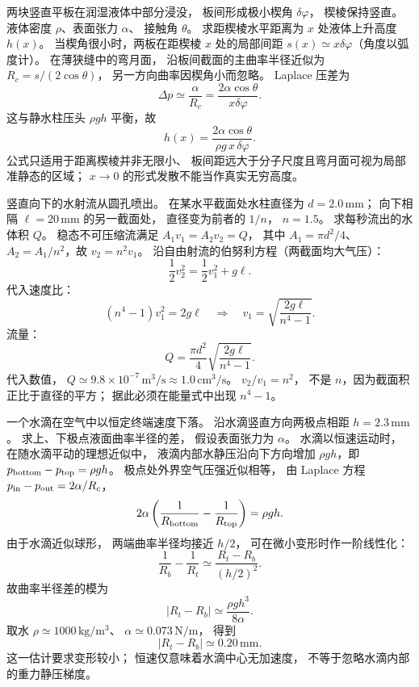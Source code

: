 两块竖直平板在润湿液体中部分浸没，
板间形成极小楔角 $\delta\varphi$，
楔棱保持竖直。
液体密度 $\rho$、表面张力 $\alpha$、
接触角 $\theta$。
求距楔棱水平距离为 $x$ 处液体上升高度 $h(x)$。
\exsolution
当楔角很小时，两板在距楔棱 $x$ 处的局部间距
$s(x)\simeq x\delta\varphi$（角度以弧度计）。
在薄狭缝中的弯月面，
沿板间截面的主曲率半径近似为
$R_c=s/(2\cos\theta)$，
另一方向曲率因楔角小而忽略。
Laplace 压差为
\[
\Delta p\simeq\frac{\alpha}{R_c}
=\frac{2\alpha\cos\theta}{x\delta\varphi}.
\]
这与静水柱压头 $\rho gh$ 平衡，故
\[
\boxed{h(x)=\frac{2\alpha\cos\theta}
{\rho g\,x\,\delta\varphi}}.
\]
\excheck 公式只适用于距离楔棱并非无限小、
板间距远大于分子尺度且弯月面可视为局部准静态的区域；
$x\to0$ 的形式发散不能当作真实无穷高度。

竖直向下的水射流从圆孔喷出。
在某水平截面处水柱直径为
$d=2.0\,\mathrm{mm}$；
向下相隔
$\ell=20\,\mathrm{mm}$ 的另一截面处，
直径变为前者的 $1/n$，
$n=1.5$。
求每秒流出的水体积 $Q$。
\exsolution
稳态不可压缩流满足
$A_1v_1=A_2v_2=Q$，
其中
$A_1=\pi d^2/4$、
$A_2=A_1/n^2$，故
$v_2=n^2v_1$。
沿自由射流的伯努利方程（两截面均大气压）：
\[
\frac12v_2^2=\frac12v_1^2+g\ell.
\]
代入速度比：
\[
(n^4-1)v_1^2=2g\ell
\quad\Longrightarrow\quad
v_1=\sqrt{\frac{2g\ell}{n^4-1}}.
\]
流量：
\[
\boxed{Q=\frac{\pi d^2}{4}
\sqrt{\frac{2g\ell}{n^4-1}}}.
\]
代入数值，
$\boxed{Q\simeq9.8\times10^{-7}\,\mathrm{m^3/s}
\approx1.0\,\mathrm{cm^3/s}}$。
\excheck $v_2/v_1=n^2$，
不是 $n$，因为截面积正比于直径的平方；
据此必须在能量式中出现 $n^4-1$。

一个水滴在空气中以恒定终端速度下落。
沿水滴竖直方向两极点相距
$h=2.3\,\mathrm{mm}$。
求上、下极点液面曲率半径的差，
假设表面张力为 $\alpha$。
\exsolution
水滴以恒速运动时，
在随水滴平动的理想近似中，
液滴内部水静压沿向下方向增加
$\rho gh$，即
$p_{\rm bottom}-p_{\rm top}=\rho gh$。
极点处外界空气压强近似相等，
由 Laplace 方程
$p_{\rm in}-p_{\rm out}=2\alpha/R_c$，
\[
2\alpha\left(\frac1{R_{\rm bottom}}
-\frac1{R_{\rm top}}\right)=\rho gh.
\]
由于水滴近似球形，
两端曲率半径均接近 $h/2$，
可在微小变形时作一阶线性化：
\[
\frac1{R_b}-\frac1{R_t}
\simeq\frac{R_t-R_b}{(h/2)^2}.
\]
故曲率半径差的模为
\[
\boxed{|R_t-R_b|\simeq\frac{\rho gh^3}{8\alpha}}.
\]
取水 $\rho\simeq1000\,\mathrm{kg/m^3}$、
$\alpha\simeq0.073\,\mathrm{N/m}$，
得到
\[
\boxed{|R_t-R_b|\simeq0.20\,\mathrm{mm}}.
\]
\excheck 这一估计要求变形较小；
恒速仅意味着水滴中心无加速度，
不等于忽略水滴内部的重力静压梯度。

